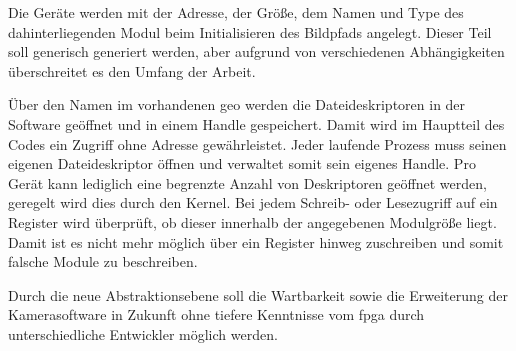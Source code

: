 Die Geräte werden mit der Adresse, der Größe, dem Namen und Type des dahinterliegenden Modul beim Initialisieren des Bildpfads angelegt. Dieser Teil soll generisch generiert werden, aber aufgrund von verschiedenen Abhängigkeiten überschreitet es den Umfang der Arbeit.


Über den Namen im vorhandenen \ac{geo} werden die Dateideskriptoren in der Software geöffnet und in einem Handle gespeichert. Damit wird im Hauptteil des Codes ein Zugriff ohne Adresse gewährleistet. Jeder laufende Prozess muss seinen eigenen Dateideskriptor öffnen und verwaltet somit sein eigenes Handle. Pro Gerät kann lediglich eine begrenzte Anzahl von Deskriptoren geöffnet werden, geregelt wird dies durch den Kernel. 
Bei jedem Schreib- oder Lesezugriff auf ein Register wird überprüft, ob dieser innerhalb der angegebenen Modulgröße liegt. Damit ist es nicht mehr möglich über ein Register hinweg zuschreiben und somit falsche Module zu beschreiben.


Durch die neue Abstraktionsebene soll die Wartbarkeit sowie die Erweiterung der Kamerasoftware in Zukunft ohne tiefere Kenntnisse vom \ac{fpga} durch unterschiedliche Entwickler möglich werden.








